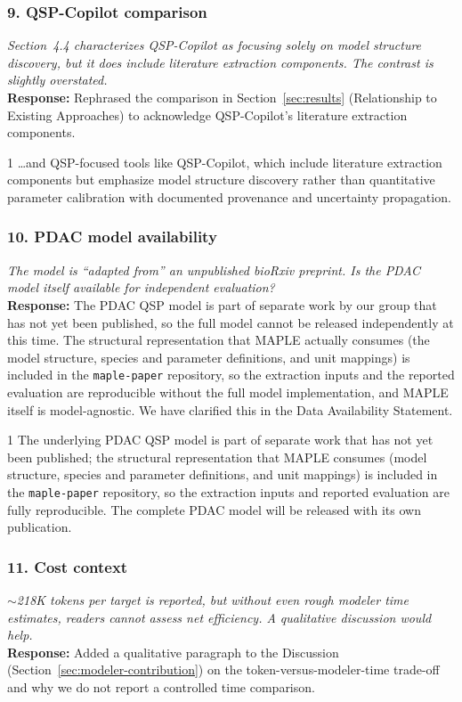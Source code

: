 \documentclass[11pt]{article}
\newcommand{\reviewer}[1]{\textcolor{reviewercolor}{\textit{#1}}}
\newcommand{\response}[1]{\textcolor{responsecolor}{\textbf{Response:} #1}}
\providecommand{\trackchanges}{1}
\newenvironment{revised}{\if1\trackchanges\color{blue}\fi}{}
\begin{document}
\subsubsection*{9. QSP-Copilot comparison}
\reviewer{Section~4.4 characterizes QSP-Copilot as focusing solely on model structure discovery, but it does include literature extraction components. The contrast is slightly overstated.}\\
\response{Rephrased the comparison in Section~\ref{sec:results} (Relationship to Existing Approaches) to acknowledge QSP-Copilot's literature extraction components.}

\begin{revised}
\ldots and QSP-focused tools like QSP-Copilot, which include literature extraction components but emphasize model structure discovery rather than quantitative parameter calibration with documented provenance and uncertainty propagation.
\end{revised}

\subsubsection*{10. PDAC model availability}
\reviewer{The model is ``adapted from'' an unpublished bioRxiv preprint. Is the PDAC model itself available for independent evaluation?}\\
\response{The PDAC QSP model is part of separate work by our group that has not yet been published, so the full model cannot be released independently at this time. The structural representation that MAPLE actually consumes (the model structure, species and parameter definitions, and unit mappings) is included in the \texttt{maple-paper} repository, so the extraction inputs and the reported evaluation are reproducible without the full model implementation, and MAPLE itself is model-agnostic. We have clarified this in the Data Availability Statement.}

\begin{revised}
The underlying PDAC QSP model is part of separate work that has not yet been published; the structural representation that MAPLE consumes (model structure, species and parameter definitions, and unit mappings) is included in the \texttt{maple-paper} repository, so the extraction inputs and reported evaluation are fully reproducible. The complete PDAC model will be released with its own publication.
\end{revised}

\subsubsection*{11. Cost context}
\reviewer{$\sim$218K tokens per target is reported, but without even rough modeler time estimates, readers cannot assess net efficiency. A qualitative discussion would help.}\\
\response{Added a qualitative paragraph to the Discussion (Section~\ref{sec:modeler-contribution}) on the token-versus-modeler-time trade-off and why we do not report a controlled time comparison.}
\end{document}
